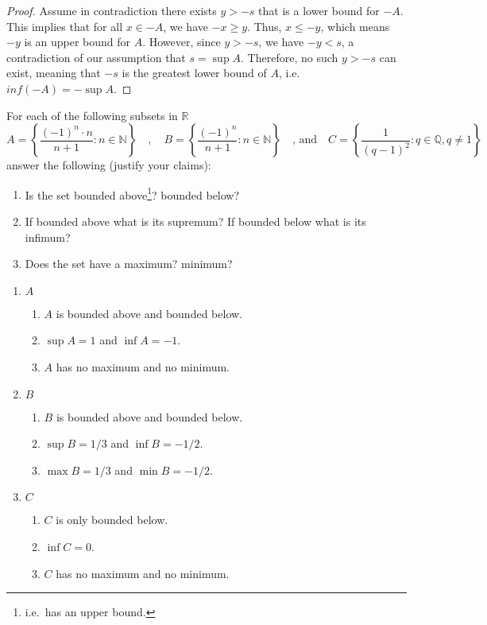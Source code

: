 \documentclass[10pt]{article}
\newcommand{\N}{\mathbb{N}}
\newcommand{\R}{\mathbb{R}}
\newcommand{\Q}{\mathbb{Q}}
\newenvironment{problem}[2][Problem]{\begin{trivlist}
\item[\hskip \labelsep {\bfseries #1}\hskip \labelsep {\bfseries #2.}]}{\end{trivlist}}
\begin{document}
\begin{problem}{3}
\begin{enumerate}
\begin{proof}
                Assume in contradiction there exists $y> -s$ that is a lower bound for $-A$. This implies that for all $x \in -A$, we have $-x\geq y$. Thus, $x \leq -y$, which means $-y$ is an upper bound for $A$. However, since $y>-s$, we have $-y<s$, a contradiction of our assumption that $s = \sup A$. Therefore, no such $y > -s$ can exist, meaning that $-s$ is the greatest lower bound of $A$, i.e. $inf(-A) = -\sup A$. 
            \end{proof}
	\end{enumerate}
\end{problem}

\newpage

\begin{problem}{4}
	For each of the following subsets in $ \R $
	\[ A=\left\{ \frac{(-1)^n \cdot n}{n+1} : n \in \N \right\} \quad,\quad B=\left\{ \frac{(-1)^n}{n+1} : n \in \N \right\} \quad \text{, and}\quad C=\left\{ \frac{1}{(q-1)^2} : q \in \Q, q \neq 1 \right\}  \]
	answer the following (justify your claims):
	\begin{enumerate}
		\item Is the set bounded above\footnote{i.e.~has an upper bound.}? bounded below?
		\item If bounded above what is its supremum? If bounded below what is its infimum?
		\item Does the set have a maximum? minimum?
	\end{enumerate}
    \begin{enumerate}
        \item $A$
            \begin{enumerate}
                \item $A$ is bounded above and bounded below.
                \item $\sup A = 1$ and $\inf A = -1$.
                \item $A$ has no maximum and no minimum.
            \end{enumerate}
        \item $B$
            \begin{enumerate}
                \item $B$ is bounded above and bounded below.
                \item $\sup B = 1/3$ and $\inf B = -1/2$.
                \item $\max B = 1/3$ and $\min B = -1/2$.
            \end{enumerate}
        \item $C$
            \begin{enumerate}
                \item $C$ is only bounded below.
                \item $\inf C = 0$.
                \item $C$ has no maximum and no minimum.
            \end{enumerate}
    \end{enumerate}
\end{problem}
\medskip
\end{document}
